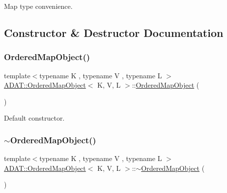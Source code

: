 Map type convenience. 



\subsection{Constructor \& Destructor Documentation}
\mbox{\label{classADAT_1_1OrderedMapObject_ac9ea7852b3e405d4e0c6744626cb6f24}} 
\subsubsection{\texorpdfstring{OrderedMapObject()}{OrderedMapObject()}\hspace{0.1cm}{\footnotesize\ttfamily [1/2]}}
{\footnotesize\ttfamily template$<$typename K , typename V , typename L $>$ \\
\mbox{\hyperlink{classADAT_1_1OrderedMapObject}{A\+D\+A\+T\+::\+Ordered\+Map\+Object}}$<$ K, V, L $>$\+::\mbox{\hyperlink{classADAT_1_1OrderedMapObject}{Ordered\+Map\+Object}} (\begin{DoxyParamCaption}{ }\end{DoxyParamCaption})\hspace{0.3cm}{\ttfamily [inline]}}



Default constructor. 

\mbox{\label{classADAT_1_1OrderedMapObject_a255777a3e2ecc4482ad8d2adf630a8d2}} 
\subsubsection{\texorpdfstring{$\sim$OrderedMapObject()}{~OrderedMapObject()}\hspace{0.1cm}{\footnotesize\ttfamily [1/2]}}
{\footnotesize\ttfamily template$<$typename K , typename V , typename L $>$ \\
\mbox{\hyperlink{classADAT_1_1OrderedMapObject}{A\+D\+A\+T\+::\+Ordered\+Map\+Object}}$<$ K, V, L $>$\+::$\sim$\mbox{\hyperlink{classADAT_1_1OrderedMapObject}{Ordered\+Map\+Object}} (\begin{DoxyParamCaption}{ }\end{DoxyParamCaption})\hspace{0.3cm}{\ttfamily [inline]}}



